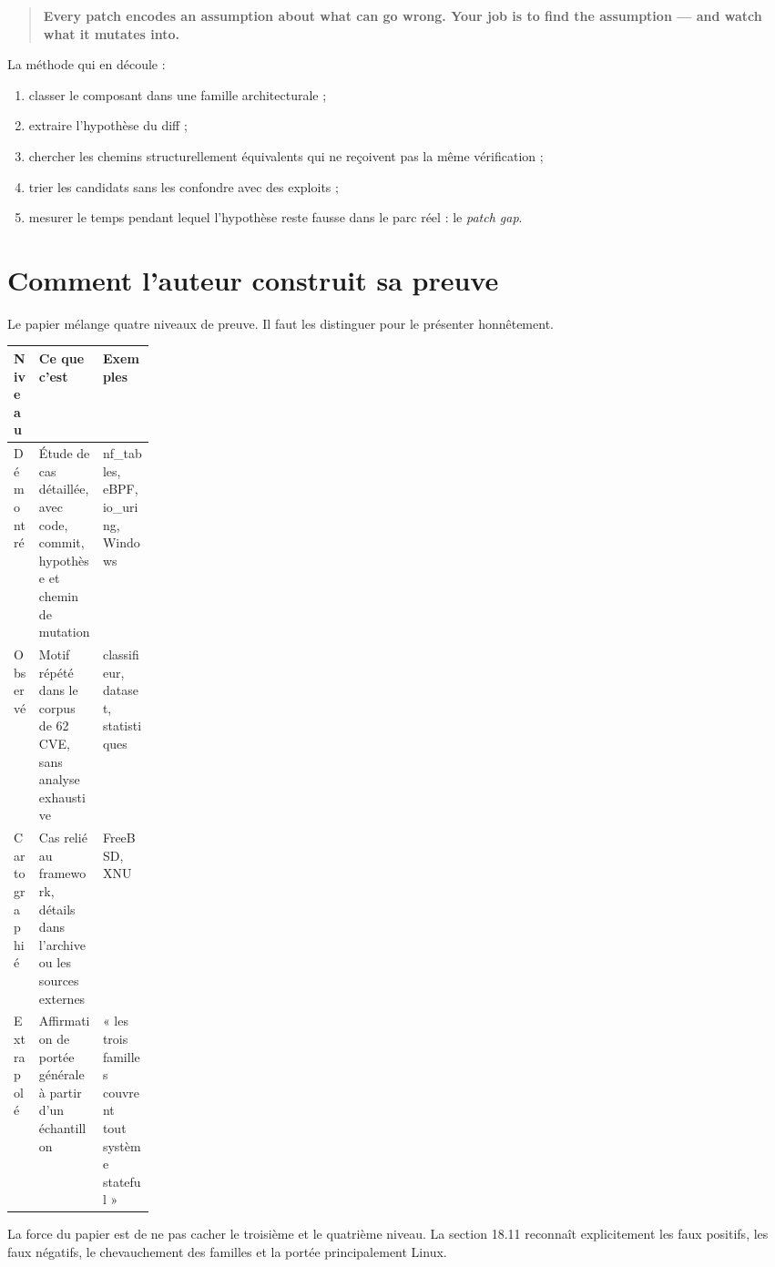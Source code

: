 \documentclass{training}
\begin{document}
\begin{quote}
\textbf{Every patch encodes an assumption about what can go wrong. Your job
is to find the assumption --- and watch what it mutates into.}
\end{quote}

La méthode qui en découle :

\begin{enumerate}
  \item classer le composant dans une famille architecturale ;
  \item extraire l'hypothèse du diff ;
  \item chercher les chemins structurellement équivalents qui ne reçoivent
        pas la même vérification ;
  \item trier les candidats sans les confondre avec des exploits ;
  \item mesurer le temps pendant lequel l'hypothèse reste fausse dans le
        parc réel : le \emph{patch gap}.
\end{enumerate}

\chapter{Comment l'auteur construit sa preuve}

Le papier mélange quatre niveaux de preuve. Il faut les distinguer pour le
présenter honnêtement.

\begin{center}
\begin{tabularx}{\linewidth}{|p{0.18\linewidth}|X|X|}
\hline
\textbf{Niveau} & \textbf{Ce que c'est} & \textbf{Exemples} \\ \hline
Démontré & Étude de cas détaillée, avec code, commit, hypothèse et chemin de
mutation & nf\_tables, eBPF, io\_uring, Windows \\ \hline
Observé & Motif répété dans le corpus de 62 CVE, sans analyse exhaustive &
classifieur, dataset, statistiques \\ \hline
Cartographié & Cas relié au framework, détails dans l'archive ou les sources
externes & FreeBSD, XNU \\ \hline
Extrapolé & Affirmation de portée générale à partir d'un échantillon & « les
trois familles couvrent tout système stateful » \\ \hline
\end{tabularx}
\end{center}

La force du papier est de ne pas cacher le troisième et le quatrième niveau.
La section 18.11 reconnaît explicitement les faux positifs, les faux négatifs,
le chevauchement des familles et la portée principalement Linux.
\end{document}
